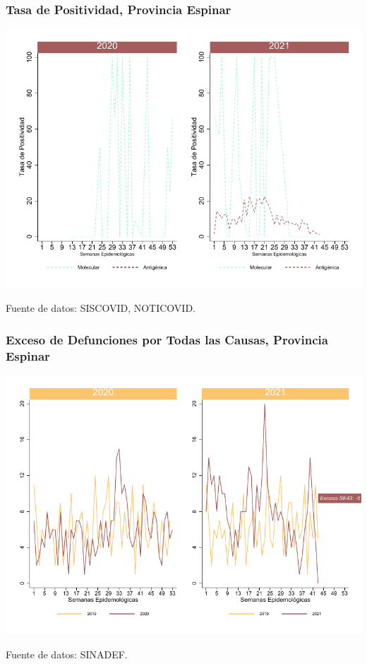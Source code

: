 \documentclass[xcolor=table]{beamer}
\begin{document}
\begin{frame}
	\frametitle{Tasa de Positividad, Provincia Espinar}
	\vspace{-.5cm}
	\begin{center}
		\includegraphics[width=0.8\linewidth, trim={0cm .5cm 0cm 0.2cm},clip]{../figuras/positividad_20_21_8.pdf}
	\end{center}
	{\tiny Fuente de datos: SISCOVID, NOTICOVID.}
\end{frame}

\begin{frame}
	\frametitle{Exceso de Defunciones por Todas las Causas, Provincia Espinar}
	\vspace{-.5cm}
	\begin{center}
		\includegraphics[width=0.8\linewidth, trim={0cm .5cm 0cm 0.2cm},clip]{../figuras/exceso_8.pdf}
	\end{center}
	{\tiny Fuente de datos: SINADEF.}
	
	\hyperlink{indicadores_provinciales}{}
\end{frame}
\end{document}
